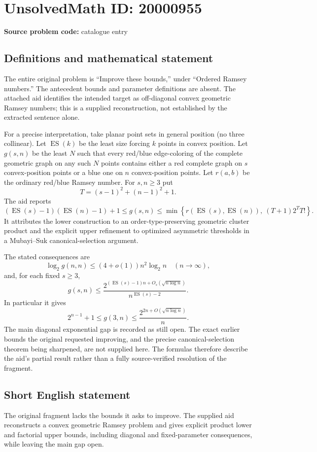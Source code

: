 \documentclass[11pt]{article}
\begin{document}
\section*{UnsolvedMath ID: 20000955}
\textbf{Source problem code:} catalogue entry
\subsection{Definitions and mathematical statement}
The entire original problem is ``Improve these bounds,'' under ``Ordered Ramsey numbers.'' The antecedent bounds and parameter definitions are absent. The attached aid identifies the intended target as off-diagonal convex geometric Ramsey numbers; this is a supplied reconstruction, not established by the extracted sentence alone.

For a precise interpretation, take planar point sets in general position (no three collinear). Let $\operatorname{ES}(k)$ be the least size forcing $k$ points in convex position. Let $g(s,n)$ be the least $N$ such that every red/blue edge-coloring of the complete geometric graph on any such $N$ points contains either a red complete graph on $s$ convex-position points or a blue one on $n$ convex-position points. Let $r(a,b)$ be the ordinary red/blue Ramsey number. For $s,n\ge3$ put
\[
T=(s-1)^2+(n-1)^2+1.
\]
The aid reports
\[
(\operatorname{ES}(s)-1)(\operatorname{ES}(n)-1)+1\le g(s,n)
\le\min\left\{r(\operatorname{ES}(s),\operatorname{ES}(n)),\ (T+1)2^T T!\right\}.
\]
It attributes the lower construction to an order-type-preserving geometric cluster product and the explicit upper refinement to optimized asymmetric thresholds in a Mubayi--Suk canonical-selection argument.

The stated consequences are
\[
\log_2g(n,n)\le(4+o(1))n^2\log_2n\quad(n\to\infty),
\]
and, for each fixed $s\ge3$,
\[
g(s,n)\le\frac{2^{(\operatorname{ES}(s)-1)n+O_s(\sqrt{n\log n})}}{n^{\operatorname{ES}(s)-2}}.
\]
In particular it gives
\[
2^{n-1}+1\le g(3,n)\le\frac{2^{2n+O(\sqrt{n\log n})}}n.
\]
The main diagonal exponential gap is recorded as still open. The exact earlier bounds the original requested improving, and the precise canonical-selection theorem being sharpened, are not supplied here. The formulas therefore describe the aid's partial result rather than a fully source-verified resolution of the fragment.
\subsection{Short English statement}
The original fragment lacks the bounds it asks to improve. The supplied aid reconstructs a convex geometric Ramsey problem and gives explicit product lower and factorial upper bounds, including diagonal and fixed-parameter consequences, while leaving the main gap open.
\end{document}
